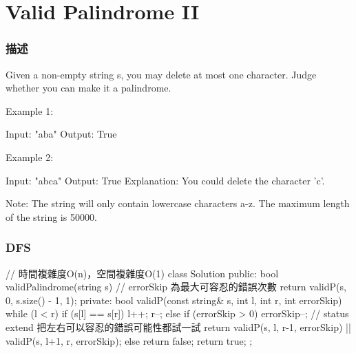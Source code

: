 \section{Valid Palindrome II} %
\label{sec:valid-palindrome-ii}


\subsubsection{描述}
Given a non-empty string s, you may delete at most one character. Judge whether you can make it a palindrome.


Example 1:
\begin{Code}
Input: "aba"
Output: True
\end{Code}

Example 2:
\begin{Code}
Input: "abca"
Output: True
Explanation: You could delete the character 'c'.
\end{Code}

Note:
The string will only contain lowercase characters a-z. The maximum length of the string is 50000.

\subsubsection{DFS}
\begin{Code}
// 時間複雜度O(n)，空間複雜度O(1)
class Solution {
public:
    bool validPalindrome(string s) {
        // errorSkip 為最大可容忍的錯誤次數
        return validP(s, 0, s.size() - 1, 1);
    }
private:
    bool validP(const string& s, int l, int r, int errorSkip)
    {
        while (l < r)
        {
            if (s[l] == s[r])
            {
                l++;
                r--;
            }
            else if (errorSkip > 0)
            {
                errorSkip--;
                // status extend 把左右可以容忍的錯誤可能性都試一試
                return validP(s, l, r-1, errorSkip)
                    || validP(s, l+1, r, errorSkip);
            }
            else
                return false;
        }
        return true;
    }
};
\end{Code}

